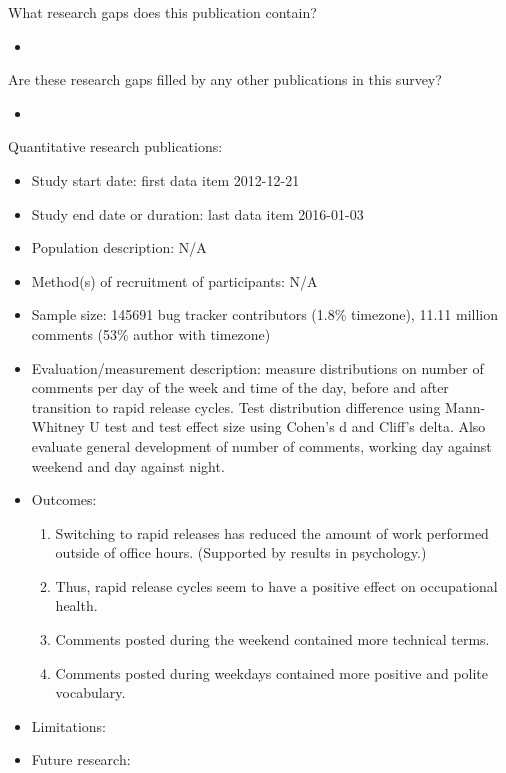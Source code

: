 \documentclass[]{book}
\providecommand{\tightlist}{%
  \setlength{\itemsep}{0pt}\setlength{\parskip}{0pt}}
\begin{document}
What research gaps does this publication contain?

\begin{itemize}
\item
\end{itemize}

Are these research gaps filled by any other publications in this survey?

\begin{itemize}
\item
\end{itemize}

Quantitative research publications:

\begin{itemize}
\tightlist
\item
  Study start date: first data item 2012-12-21
\item
  Study end date or duration: last data item 2016-01-03
\item
  Population description: N/A
\item
  Method(s) of recruitment of participants: N/A
\item
  Sample size: 145691 bug tracker contributors (1.8\% timezone), 11.11
  million comments (53\% author with timezone)
\item
  Evaluation/measurement description: measure distributions on number of
  comments per day of the week and time of the day, before and after
  transition to rapid release cycles. Test distribution difference using
  Mann-Whitney U test and test effect size using Cohen's d and Cliff's
  delta. Also evaluate general development of number of comments,
  working day against weekend and day against night.
\item
  Outcomes:

  \begin{enumerate}
  \def\labelenumi{\arabic{enumi}.}
  \tightlist
  \item
    Switching to rapid releases has reduced the amount of work performed
    outside of office hours. (Supported by results in psychology.)
  \item
    Thus, rapid release cycles seem to have a positive effect on
    occupational health.
  \item
    Comments posted during the weekend contained more technical terms.
  \item
    Comments posted during weekdays contained more positive and polite
    vocabulary.
  \end{enumerate}
\item
  Limitations:
\item
  Future research:
\end{itemize}
\end{document}
